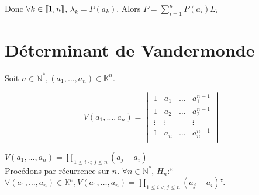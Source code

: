 \documentclass[]{article}
\begin{document}
Donc $\forall k \in \llbracket {1}, {n} \rrbracket$, $\lambda_k = P(a_k)$. Alors $P = \sum_{i = 1}^{n} P(a_i)L_i$

\section{Déterminant de Vandermonde}

Soit $n \in \mathbb{N}^*, (a_1, \dots, a_n) \in \mathbb{K}^n$. 

\[ V(a_1, \dots, a_n) = \begin{vmatrix}
    1 & a_1 & \dots & a_1^{n-1} \\
    1 & a_2 & \dots & a_2^{n-1} \\
    \vdots & \vdots &  & \vdots \\
    1 & a_n & \dots & a_n^{n-1} \\
\end{vmatrix} \]

\underline{$V(a_1, \dots, a_n) = \prod_{1 \leq i < j \leq n} (a_j - a_i)$} \\

Procédons par récurrence sur $n$. $\forall n \in \mathbb{N}^*$, $H_n$:``$\forall (a_1, \dots, a_n) \in \mathbb{K}^n, V(a_1, \dots, a_n) = \prod_{1 \leq i < j \leq n} (a_j - a_i)$''.
\end{document}
